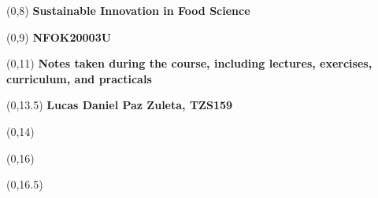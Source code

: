 \begin{titlepage}

    
    \begin{textblock}{9.4}(0,8)
        \Huge{\selectfont\bfseries{Sustainable Innovation in Food Science}}
    \end{textblock}
    \begin{textblock}{9.4}(0,9)
        \Huge{\selectfont\bfseries{NFOK20003U}}
    \end{textblock}
    
    \begin{textblock}{9.4}(0,11)
        \LARGE{\selectfont\bfseries{Notes taken during the course, including lectures, exercises, curriculum, and practicals}}
    \end{textblock}
    
    \begin{textblock}{9.4}(0,13.5)
        \large{\selectfont\bfseries{
        Lucas Daniel Paz Zuleta, TZS159}}
    \end{textblock}
    
    \begin{textblock}{9.4}(0,14)
        \large{\selectfont{MSc student at the University of Copenhagen}}
    \end{textblock}
    
    \begin{textblock}{9.4}(0,16)
        \large{\selectfont{Last compiled: \today}}
    \end{textblock}
    
    \begin{textblock}{8.4}(0,16.5)
        \large{}
    \end{textblock}
    

\end{titlepage}
